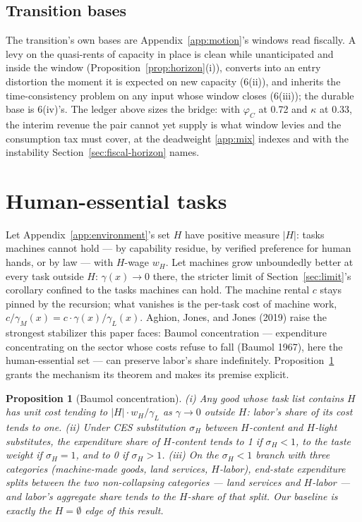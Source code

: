 \documentclass[12pt]{article}
\theoremstyle{plain}
\newtheorem{proposition}{Proposition}
\begin{document}
\subsection{Transition bases}\label{app:transition-bases}

The transition's own bases are Appendix~\ref{app:motion}'s windows read fiscally. A levy on the quasi-rents of capacity in place is clean while unanticipated and inside the window (Proposition~\ref{prop:horizon}(i)), converts into an entry distortion the moment it is expected on new capacity (6(ii)), and inherits the time-consistency problem on any input whose window closes (6(iii)); the durable base is 6(iv)'s. The ledger above sizes the bridge: with $\varphi _C$ at 0.72 and $\kappa$ at 0.33, the interim revenue the pair cannot yet supply is what window levies and the consumption tax must cover, at the deadweight \ref{app:mix} indexes and with the instability Section~\ref{sec:fiscal-horizon} names.

\section{Human-essential tasks}\label{app:human}

Let Appendix~\ref{app:environment}'s set $H$ have positive measure $|H|$: tasks machines cannot hold --- by capability residue, by verified preference for human hands, or by law --- with $H$-wage $w_H$. Let machines grow unboundedly better at every task outside $H$: $\gamma (x) \to 0$ there, the stricter limit of Section~\ref{sec:limit}'s corollary confined to the tasks machines can hold. The machine rental $c$ stays pinned by the recursion; what vanishes is the per-task cost of machine work, $c/\gamma _M(x) = c\cdot \gamma (x)/\gamma _L(x)$. Aghion, Jones, and Jones (2019) raise the strongest stabilizer this paper faces: Baumol concentration --- expenditure concentrating on the sector whose costs refuse to fall (Baumol 1967), here the human-essential set --- can preserve labor's share indefinitely. Proposition~\ref{prop:baumol} grants the mechanism its theorem and makes its premise explicit.

\begin{proposition}[Baumol concentration]\label{prop:baumol}
(i) Any good whose task list contains $H$ has unit cost tending to $|H|\cdot w_H/\gamma _L$ as $\gamma \to 0$ outside $H$: labor's share of its cost tends to one. (ii) Under CES substitution $\sigma _H$ between $H$-content and $H$-light substitutes, the expenditure share of $H$-content tends to 1 if $\sigma _H < 1$, to the taste weight if $\sigma _H = 1$, and to 0 if $\sigma _H > 1$. (iii) On the $\sigma _H < 1$ branch with three categories (machine-made goods, land services, $H$-labor), end-state expenditure splits between the two non-collapsing categories --- land services and $H$-labor --- and labor's aggregate share tends to the $H$-share of that split. Our baseline is exactly the $H = \emptyset$ edge of this result.
\end{proposition}
\end{document}
